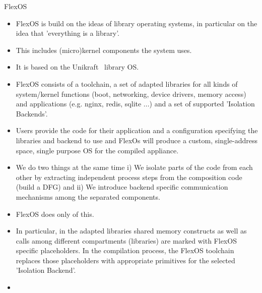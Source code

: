 FlexOS~\cite{lefeuvre2021flexos} 
\begin{itemize}
    \item FlexOS is build on the ideas of library operating systems, in particular on the idea that 'everything is a library'. 
    \item This includes (micro)kernel components the system uses. 
    \item It is based on the Unikraft~\cite{kuenzer2021unikraft} library OS.
    \item FlexOS consists of a toolchain, a set of adapted libraries for all kinds of system/kernel functions (boot, networking, device drivers, memory access) and applications (e.g. nginx, redis, sqlite ...) and a set of supported 'Isolation Backends'. 
    \item Users provide the code for their application and a configuration specifying the libraries and backend to use and FlexOs will produce a custom, single-address space, single purpose OS for the compiled appliance.
    \item We do two things at the same time i) We isolate parts of the code from each other by extracting independent process steps from the composition code (build a DFG) and ii) We introduce backend specific communication mechanisms among the separated components. 
    \item FlexOS does only of this. 
    \item In particular, in the adapted libraries shared memory constructs as well as calls among different compartments (libraries) are marked with FlexOS specific placeholders. In the compilation process, the FlexOS toolchain replaces those placeholders with appropriate primitives for the selected 'Isolation Backend'. 
    \item {}
\end{itemize}

